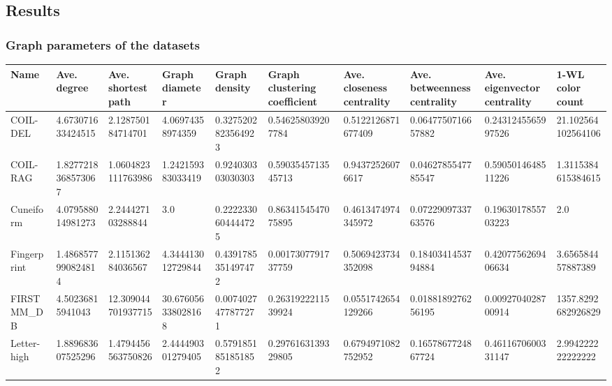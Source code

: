 \documentclass{article}
\begin{document}
\begin{description}
\end{description}

\subsection{Results}

\subsubsection{Graph parameters of the datasets}

\begin{table}[!ht]
    \footnotesize
    \centering
    \begin{tabular}{|l|l|l|l|l|l|l|l|l|l|}
    \hline
        \textbf{Name} & \textbf{Ave. degree} & \textbf{Ave. shortest path} & \textbf{Graph diameter} & \textbf{Graph density} & \textbf{Graph clustering coefficient} & \textbf{Ave. closeness centrality} & \textbf{Ave. betweenness centrality} & \textbf{Ave. eigenvector centrality} & \textbf{1-WL color count} \\ \hline
        COIL-DEL & 4.673071633424515 & 2.128750184714701 & 4.06974358974359 & 0.3275202823564923 & 0.546258039207784 & 0.5122126871677409 & 0.0647750716657882 & 0.2431245565997526 & 21.102564102564106 \\ \hline
        COIL-RAG & 1.8277218368573067 & 1.0604823111763986 & 1.242159383033419 & 0.924030303030303 & 0.5903545713545713 & 0.94372526076617 & 0.0462785547785547 & 0.5905014648511226 & 1.3115384615384615 \\ \hline
        Cuneiform & 4.079588014981273 & 2.244427103288844 & 3.0 & 0.2222330604444725 & 0.8634154547075895 & 0.4613474974345972 & 0.0722909733763576 & 0.1963017855703223 & 2.0 \\ \hline
        Fingerprint & 1.4868577990824814 & 2.115136284036567 & 4.344413012729844 & 0.4391785351497472 & 0.0017307791737759 & 0.5069423734352098 & 0.1840341453794884 & 0.4207756269406634 & 3.656584457887389 \\ \hline
        FIRSTMM\_DB & 4.50236815941043 & 12.309044701937715 & 30.676056338028168 & 0.0074027477877271 & 0.2631922211539924 & 0.0551742654129266 & 0.0188189276256195 & 0.0092704028700914 & 1357.8292682926829 \\ \hline
        Letter-high & 1.889683607525296 & 1.4794456563750826 & 2.444490301279405 & 0.5791851851851852 & 0.2976163139329805 & 0.6794971082752952 & 0.1657867724867724 & 0.4611670600331147 & 2.994222222222222 \\ \hline

\end{tabular}
\end{table}
\end{document}
